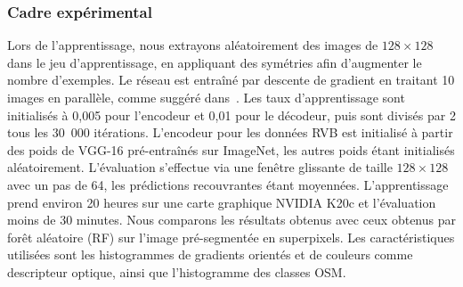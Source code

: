 \subsubsection{Cadre expérimental}
Lors de l'apprentissage, nous extrayons aléatoirement des images de $128\times128$ dans le jeu d'apprentissage, en appliquant des symétries afin d'augmenter le nombre d'exemples. Le réseau est entraîné par descente de gradient en traitant 10 images en parallèle, comme suggéré dans~\cite{audebert_semantic_2016}. Les taux d'apprentissage sont initialisés à 0,005 pour l'encodeur et 0,01 pour le décodeur, puis sont divisés par 2 tous les 30~000 itérations. L'encodeur pour les données RVB est initialisé à partir des poids de VGG-16 pré-entraînés sur ImageNet, les autres poids étant initialisés aléatoirement.
L'évaluation s'effectue via une fenêtre glissante de taille $128\times128$ avec un pas de 64, les prédictions recouvrantes étant moyennées. L'apprentissage prend environ 20 heures sur une carte graphique NVIDIA K20c et l'évaluation moins de 30 minutes. Nous comparons les résultats obtenus avec ceux obtenus par forêt aléatoire (RF) sur l'image pré-segmentée en superpixels. Les caractéristiques utilisées sont les histogrammes de gradients orientés et de couleurs comme descripteur optique, ainsi que l'histogramme des classes OSM.

